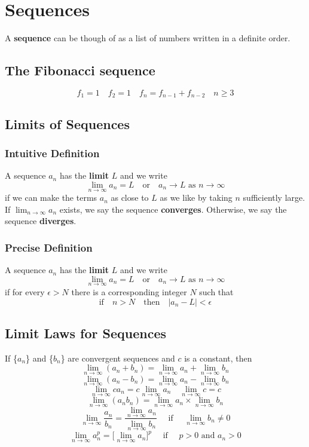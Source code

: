 %
%

\section*{Sequences}

A \textbf{sequence} can be though of as a list of numbers written in a definite order. 

\subsection*{The Fibonacci sequence}

\[ f_1 = 1 \quad f_2 = 1 \quad f_n = f_{n-1} + f_{n-2} \quad n \geq 3 \]

\subsection*{Limits of Sequences}

\subsubsection*{Intuitive Definition}

A sequence \({a_n}\) has the \textbf{limit} \(L\) and we write
\[ \lim_{n \to \infty}{a_n = L} \quad \text{or} \quad a_n \to L \text{ as } n \to \infty \]
if we can make the terms \(a_n\) as close to \(L\) as we like by taking \(n\) sufficiently large. If \(\lim_{n \to \infty} a_n\) exists, we say the sequence \textbf{converges}. Otherwise, we say the sequence \textbf{diverges}.

\subsubsection*{Precise Definition}

A sequence \({a_n}\) has the \textbf{limit} \(L\) and we write
\[\lim_{n \to \infty}{a_n = L} \quad \text{or} \quad a_n \to L \text{ as } n \to \infty \]
if for every \( \epsilon > N \) there is a corresponding integer \(N\) such that 
\[ \text{if} \quad n > N \quad \text{then} \quad |a_n - L| < \epsilon \]

\subsection*{Limit Laws for Sequences}

If \{\(a_n\)\} and \{\(b_n\)\} are convergent sequences and \(c\) is a constant, then
\[ \lim_{n \to \infty}{(a_n + b_n)} = \lim_{n \to \infty}{a_n} + \lim_{n \to \infty}{b_n} \]
\[ \lim_{n \to \infty}{(a_n - b_n)} = \lim_{n \to \infty}{a_n} - \lim_{n \to \infty}{b_n} \]
\[ \lim_{n \to \infty}{c a_n} = c \lim_{n \to \infty}{a_n} \quad \lim_{n \to \infty}{c} = c \]
\[ \lim_{n \to \infty}{(a_n b_n)} = \lim_{n \to \infty}{a_n} \times \lim_{n \to \infty}{b_n} \]
\[ \lim_{n \to \infty}{\frac{a_n}{b_n}} = \frac{\lim_{n \to \infty}{a_n}}{\lim_{n \to \infty}{b_n}} \quad \text{ if } \quad \lim_{n \to \infty}{b_n \neq 0} \]
\[ \lim_{n \to \infty}{a_n^p} = \Big[\lim_{n \to \infty}{a_n} \Big]^p \quad \text{ if } \quad p > 0 \text{ and } a_n > 0 \]

